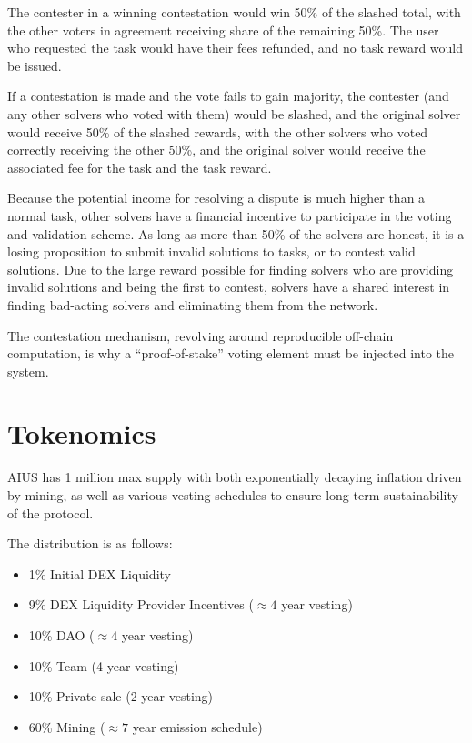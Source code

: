 \documentclass{article}
\begin{document}
The contester in a winning contestation would win 50\% of the slashed total, with the other voters in agreement receiving share of the remaining 50\%. The user who requested the task would have their fees refunded, and no task reward would be issued.

If a contestation is made and the vote fails to gain majority, the contester (and any other solvers who voted with them) would be slashed, and the original solver would receive 50\% of the slashed rewards, with the other solvers who voted correctly receiving the other 50\%, and the original solver would receive the associated fee for the task and the task reward.

Because the potential income for resolving a dispute is much higher than a normal task, other solvers have a financial incentive to participate in the voting and validation scheme. As long as more than 50\% of the solvers are honest, it is a losing proposition to submit invalid solutions to tasks, or to contest valid solutions. Due to the large reward possible for finding solvers who are providing invalid solutions and being the first to contest, solvers have a shared interest in finding bad-acting solvers and eliminating them from the network.

The contestation mechanism, revolving around reproducible off-chain computation, is why a ``proof-of-stake'' voting element must be injected into the system. 

\newpage

\section{Tokenomics}\label{tokenomics}

AIUS has 1 million max supply with both exponentially decaying inflation driven by mining, as well as various vesting schedules to ensure long term sustainability of the protocol.

The distribution is as follows:

\begin{itemize}
    \item 1\% Initial DEX Liquidity
    \item 9\% DEX Liquidity Provider Incentives ($\approx4$ year vesting)
    \item 10\% DAO ($\approx4$ year vesting)
    \item 10\% Team (4 year vesting)
    \item 10\% Private sale (2 year vesting)
    \item 60\% Mining ($\approx7$ year emission schedule)
\end{itemize}
\end{document}
